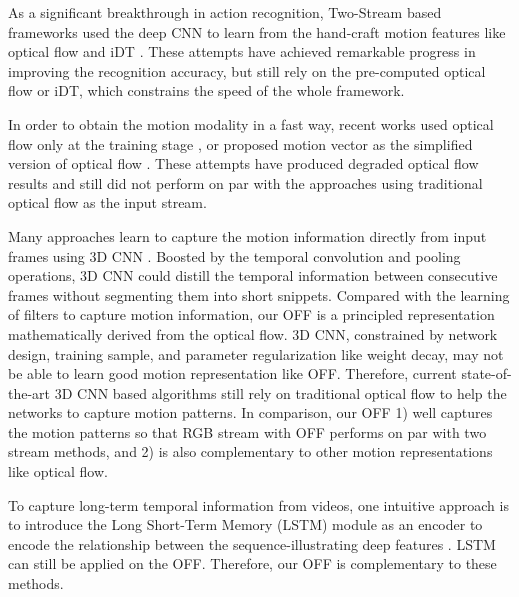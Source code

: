 \documentclass[10pt,twocolumn,letterpaper]{article}
\begin{document}
As a significant breakthrough in action recognition, Two-Stream based frameworks used the deep CNN to learn from the hand-craft motion features like optical flow and iDT \cite{simonyan2014two, wang2015tdd, zhang2016motionvector, wang2016tsn, diba20163dtwostream, yue2015beyondshortlstm, carreira2017i3d, tran2015c3d, feichtenhofer2016spatiotemporal, feichtenhofer2017spatio-temp-multiplier}. These attempts have achieved remarkable progress in improving the recognition accuracy, but still rely on the pre-computed optical flow or iDT, which constrains the speed of the whole framework. 
 
In order to obtain the motion modality in a fast way, recent works used optical flow only at the training stage \cite{ng2016actionflownet}, or proposed motion vector as the simplified version of optical flow \cite{zhang2016motionvector}. These attempts have produced degraded optical flow results and still did not perform on par with the approaches using traditional optical flow as the input stream.


Many approaches learn to capture the motion information directly from input frames using 3D CNN \cite{tran2015c3d, varol2017ltc, carreira2017i3d, tran2017res3d, diba20163dtwostream, varol2017long3dconv}. Boosted by the temporal convolution and pooling operations, 3D CNN could distill the temporal information between consecutive frames without segmenting them into short snippets. Compared with the learning of filters to capture motion information, our OFF is a principled representation mathematically derived from the optical flow. 3D CNN, constrained by network design, training sample, and parameter regularization like weight decay, may not be able to learn good motion representation like OFF. 
Therefore, current state-of-the-art 3D CNN based algorithms still rely on traditional optical flow to help the networks to capture motion patterns. In comparison, our OFF 1) well captures the motion patterns so that RGB stream with OFF performs on par with two stream methods, and 2) is also complementary to other motion representations like optical flow.




To capture long-term temporal information from videos, one intuitive approach is to introduce the Long Short-Term Memory (LSTM) module as an encoder to encode the relationship between the sequence-illustrating deep features \cite{yue2015beyondshortlstm, sun2017lattice, shi2017shuttlenet}. LSTM can still be applied on the OFF. Therefore, our OFF is complementary to these methods.  
\end{document}
